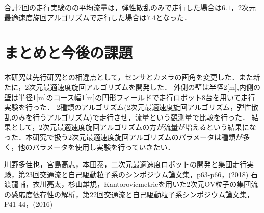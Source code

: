 \documentclass[twocolumn,dvipdfmx]{jarticle}
\begin{document}

合計7回の走行実験のの平均流量は，弾性散乱のみで走行した場合は$6.1$，2次元最適速度旋回アルゴリズムで走行した場合は$7.4$となった．

\vspace{-3mm}
\section{まとめと今後の課題}
本研究は先行研究との相違点として，センサとカメラの画角を変更した．また新たに，2次元最適速度旋回アルゴリズムを開発した．
外側の壁は半径2[m],内側の壁は半径1[m]のコース幅1[m]の円形フィールドで走行ロボット8台を用いて走行実験を行った．
2種類のアルゴリズム(2次元最適速度旋回アルゴリズム，弾性散乱のみを行うアルゴリズム)で走行させ，流量という観測量で比較を行った．
結果として，2次元最適速度旋回アルゴリズムの方が流量が増えるという結果になった．本研究で扱う2次元最適速度旋回アルゴリズムのパラメータは種類が多く，他のパラメータを使用し実験を行っていきたい．
\vspace{-1.5mm}
\begin{thebibliography}{99}
 川野多佳也，宮島高志，本田泰，二次元最適速度ロボットの開発と集団走行実験，第23回交通流と自己駆動粒子系のシンポジウム論文集，p63-p66，(2018)
 石渡龍輔，衣川亮太，杉山雄規，Kantorovicmetricを用いた2次元OV粒子の集団流の感応度依存性の解析，第22回交通流と自己駆動粒子系シンポジウム論文集，P41-44，(2016)
\end{thebibliography}
\end{document}
